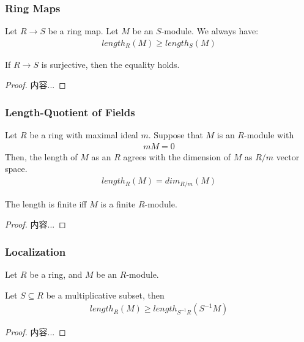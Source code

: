\documentclass[Total.tex]{subfiles}
\begin{document}
		\subsubsection{Ring Maps}
		
		\begin{lemma}
			Let $R\rightarrow S$ be a ring map. Let $M$ be an $S$-module. We always have:
			\begin{gather*}
				length_R(M)\geq length_S(M)
			\end{gather*}
			
			If $R\rightarrow S$ is surjective, then the equality holds.
		\end{lemma}
		
		\begin{proof}
			内容...
		\end{proof}
		
		\subsubsection{Length-Quotient of Fields}
		\begin{lemma}
			Let $R$ be a ring with maximal ideal $m$. Suppose that $M$ is an $R$-module with
			\begin{gather*}
				mM=0
			\end{gather*}
			Then, the length of $M$ as an $R$ agrees with the dimension of $M$ as $R/m$ vector space.
			\begin{gather*}
				length_R(M)=dim_{R/m}(M)
			\end{gather*}
			
			The length is finite iff $M$ is a finite $R$-module.
		\end{lemma}
		\begin{proof}
			内容...
		\end{proof}
		\subsubsection{Localization}
		
		\begin{lemma}
			Let $R$ be a ring, and $M$ be an $R$-module.
			
			Let $S\subseteq R$ be a multiplicative subset, then
			\begin{gather*}
				length_R(M)\geq length_{S^{-1}R}(S^{-1}M)
			\end{gather*}
		\end{lemma}
		\begin{proof}
			内容...
		\end{proof}
		
\end{document}
